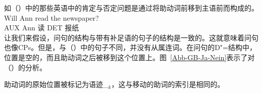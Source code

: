 如（）中的那些英语中的肯定与否定问题\label{Seite-GB-Entscheidungsfragen-Englisch}是通过将助动词前移到主语前而构成的。
\ea
\gll Will Ann read the newspaper?\\
      AUX Ann 读 DET 报纸\\
\z
让我们来假设，问句的结构与带有补足语的句子的结构是一致的。这就意味着问句也像CPs。但是，与（）中的句子不同，并没有从属连词。在问句的D"=结构中，\cnull 位置是空的，而且助动词之后被移到这个位置上。图~\vref{Abb-GB-Ja-Nein}表示了对（）的分析。
\begin{figure}
\begin{floatrow}
\end{floatrow}
\end{figure}%
助动词的原始位置被标记为语迹\_$_k$，这与移动的助词的索引是相同的。



